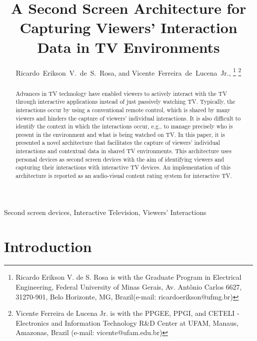 \documentclass[journal]{IEEEtran}
\begin{document}
\title{A Second Screen Architecture for Capturing Viewers' Interaction Data in TV Environments}
\author{Ricardo~Erikson~V.~de~S.~Rosa, 
	and Vicente~Ferreira~de~Lucena~Jr.,
\thanks{Ricardo Erikson V. de S. Rosa is with the Graduate Program in Electrical Engineering, Federal University of Minas Gerais, Av. Ant\^{o}nio Carlos 6627, 31270-901, Belo Horizonte, MG, Brazil(e-mail: ricardoerikson@ufmg.br)}%
\thanks{Vicente Ferreira de Lucena Jr. is with the PPGEE, PPGI, and CETELI - Electronics and Information Technology R\&D Center at UFAM, Manaus, Amazonas, Brazil (e-mail: vicente@ufam.edu.br)}%
}

\maketitle

\begin{abstract}
Advances in TV technology have enabled viewers to actively interact with the TV through interactive applications instead of just passively watching TV. Typically, the interactions occur by using a conventional remote control, which is shared by many viewers and hinders the capture of viewers' individual interactions. It is also difficult to identify the context in which the interactions occur, e.g., to manage precisely who is present in the environment and what is being watched on TV. In this paper, it is presented a novel architecture that facilitates the capture of viewers' individual interactions and contextual data in shared TV environments. This architecture uses personal devices as second screen devices with the aim of identifying viewers and capturing their interactions with interactive TV devices. An implementation of this architecture is reported as an audio-visual content rating system for interactive TV.
\end{abstract}

\begin{IEEEkeywords}
Second screen devices, Interactive Television, Viewers' Interactions
\end{IEEEkeywords}

\IEEEpeerreviewmaketitle

\section{Introduction}
\end{document}
